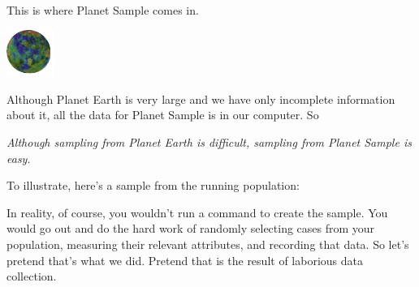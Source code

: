 This is where Planet Sample comes in.
\smallskip

\centerline{\includegraphics[width=0.6in]{images/planet-sample.png}}

%
Although Planet Earth is very large and we have only incomplete information about
it, all the data for Planet Sample is in our computer. So 

\begin{center}
\emph{Although sampling
from Planet Earth is difficult, sampling from Planet Sample is easy}.
\end{center}


To illustrate, here's a sample from the running population:
\begin{knitrout}
\end{knitrout}

In reality, of course, you wouldn't run a command to create the sample.  
You would go out and do the hard work of randomly selecting cases from your population,
measuring their relevant attributes, and recording that data.  
So let's pretend that's what we did.  Pretend that 
 is the result of laborious data collection.


